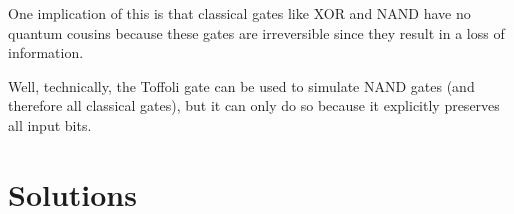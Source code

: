 One implication of this is that classical gates like \textsc{XOR} and \textsc{NAND} have no quantum cousins because these gates are irreversible since they result in a loss of information. 

Well, technically, the Toffoli gate can be used to simulate \textsc{NAND} gates (and therefore all classical gates), but it can only do so because it explicitly preserves all input bits. 

\section{Solutions}

\exercise

\exercise 
